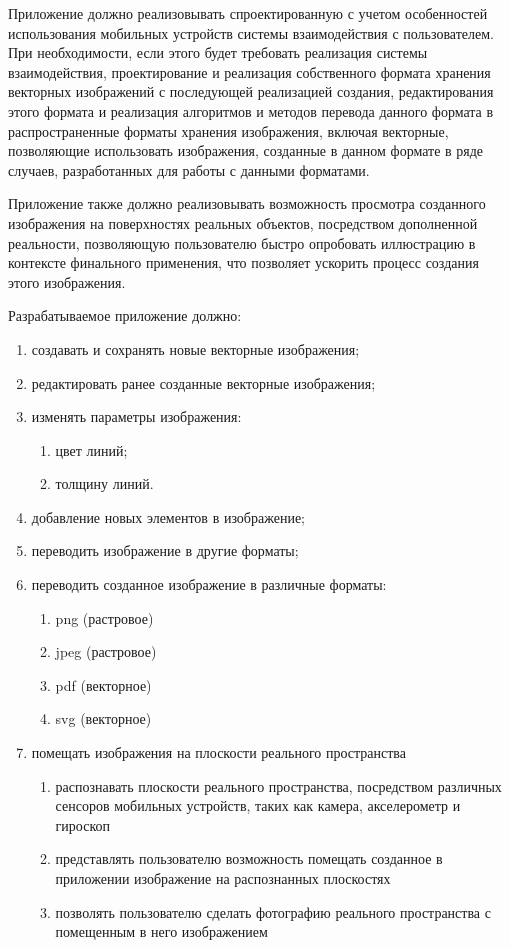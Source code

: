 Приложение должно реализовывать спроектированную с учетом особенностей использования мобильных устройств системы взаимодействия с пользователем. При необходимости, если этого будет требовать реализация системы взаимодействия, проектирование и реализация собственного формата хранения векторных изображений с последующей реализацией создания, редактирования этого формата и реализация алгоритмов и методов перевода данного формата в распространенные форматы хранения изображения, включая векторные, позволяющие использовать изображения, созданные в данном формате в ряде случаев, разработанных для работы с данными форматами. 

Приложение также должно реализовывать возможность просмотра созданного изображения на поверхностях реальных объектов, посредством дополненной реальности, позволяющую пользователю быстро опробовать иллюстрацию в контексте финального применения, что позволяет ускорить процесс создания этого изображения.

Разрабатываемое приложение должно: 

\begin{enumerate}
    \item создавать и сохранять новые векторные изображения;
    \item редактировать ранее созданные векторные изображения;
    \item изменять параметры изображения:
    \begin{enumerate}
        \item цвет линий;
        \item толщину линий.
    \end{enumerate}
    \item добавление новых элементов в изображение;
    \item переводить изображение в другие форматы;
    \item переводить созданное изображение в различные форматы:
    \begin{enumerate}
        \item png (растровое)
        \item jpeg (растровое)
        \item pdf (векторное)
        \item svg (векторное)
    \end{enumerate}
    \item помещать изображения на плоскости реального пространства
    \begin{enumerate}
        \item распознавать плоскости реального пространства, посредством различных сенсоров мобильных устройств, таких как камера, акселерометр и гироскоп
        \item представлять пользователю возможность помещать созданное в приложении изображение на распознанных плоскостях
        \item позволять пользователю сделать фотографию реального пространства с помещенным в него изображением
    \end{enumerate}
\end{enumerate}
